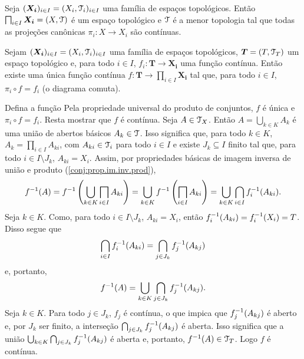 \begin{prop}
Seja $(\bm{X_i})_{i \in I} = (X_i,\mathcal{T}_i)_{i \in I}$ uma família de espaços topológicos. Então $\prod_{i \in I} \bm{X_i} = (X,\topo)$ é um espaço topológico e $\mathcal{T}$ é a menor topologia tal que todas as projeções canônicas $\pi_i: X \to X_i$ são contínuas.
\end{prop}

\begin{prop}
Sejam $(\bm{X_i})_{i \in I} = (X_i,\mathcal{T}_i)_{i \in I}$ uma família de espaços topológicos, $\bm T = (T,\mathcal{T}_T)$ um espaço topológico e, para todo $i \in I$, $f_i: \bm T \to \bm{X_i}$ uma função contínua. Então existe uma única função contínua $f: \bm T \to \prod_{i \in I} \bm{X_i}$ tal que, para todo $i \in I$, $\pi_i \circ f = f_i$ (o diagrama comuta).
\begin{figure}
\centering
{}
\end{figure}
\end{prop}
\begin{defi}
Defina a função 
Pela propriedade universal do produto de conjuntos, $f$ é única e $\pi_i \circ f = f_i$. Resta mostrar que $f$ é contínua. Seja $A \in \mathcal{T}_X$. Então $A=\bigcup_{k \in K} A_k$ é uma união de abertos básicos $A_k \in \mathcal{T}$. Isso significa que, para todo $k \in K$, $A_k = \prod_{i \in I} A_{ki}$, com $A_{ki} \in \mathcal{T}_i$ para todo $i \in I$ e existe $J_k \subseteq I$ finito tal que, para todo $i \in I \setminus J_k$, $A_{ki} = X_i$. Assim, por propriedades básicas de imagem inversa de união e produto (\ref{conj:prop.im.inv.prod}),
		\begin{equation*}
		f\inv(A) = f\inv\left(\bigcup_{k \in K}\prod_{i \in I} A_{ki}\right) = \bigcup_{k \in K} f\inv \left( \prod_{i \in I} A_{ki} \right) = \bigcup_{k \in K}\bigcap_{i \in I}f_i\inv(A_{ki}).
		\end{equation*}
Seja $k \in K$. Como, para todo $i \in I \setminus J_k$, $A_{ki} = X_i$, então $f_i^{-1}(A_{ki}) = f_i^{-1}(X_i) = T$. Disso segue que
	\begin{equation*}
	\bigcap_{i \in I}f_i^{-1}(A_{ki}) = \bigcap_{j \in J_k}f_j^{-1}(A_{kj})
	\end{equation*}
e, portanto,
	\begin{equation*}
	f^{-1}(A) = \bigcup_{k \in K}\bigcap_{j \in J_k}f_j^{-1}(A_{kj}).
	\end{equation*}
Seja $k \in K$. Para todo $j \in J_k$, $f_j$ é contínua, o que impica que $f_j^{-1}(A_{kj})$ é aberto e, por $J_k$ ser finito, a interseção $\bigcap_{j \in J_k}f_j^{-1}(A_{kj})$ é aberta. Isso significa que a união $\bigcup_{k \in K}\bigcap_{j \in J_k}f_j^{-1}(A_{kj})$ é aberta e, portanto, $f^{-1}(A) \in \mathcal{T}_T$. Logo $f$ é contínua.
\end{defi}







